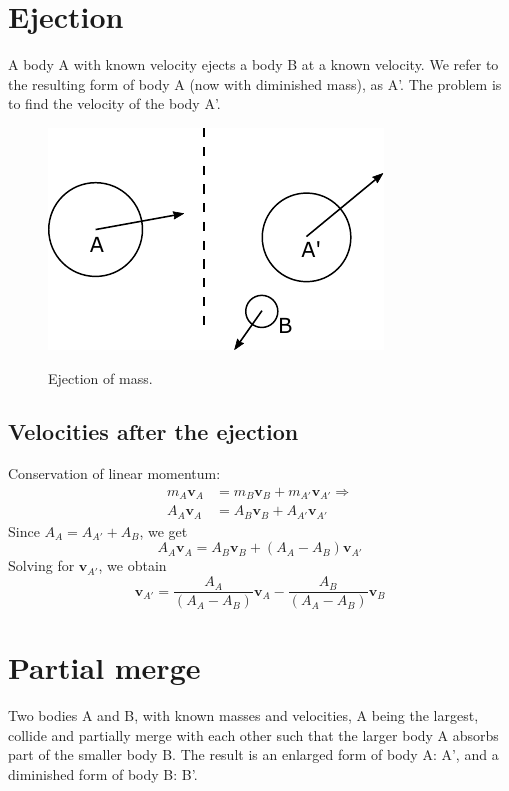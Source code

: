 \documentclass{article}
\newcommand{\vbs}[0]{\boldsymbol{v}}
\begin{document}
\section{Ejection}
A body A with known velocity ejects a body B at a known velocity. We refer to the resulting form of body A (now with diminished mass), as A'. The problem is to find the velocity of the body A'.

\begin{figure}[h]
	\centering
	{\includegraphics{figures/ejection.pdf}}
	\caption{Ejection of mass.}\label{fig:ejection}
\end{figure}

\subsection{Velocities after the ejection}

Conservation of linear momentum:
\begin{equation*}
\begin{split}
m_A\vbs_A &= m_B\vbs_B + m_{A'}\vbs_{A'}
\Rightarrow
\\A_A\vbs_A &= A_B\vbs_B + A_{A'}\vbs_{A'}
\end{split}
\end{equation*}
Since $A_A = A_{A'} + A_B$, we get
\begin{equation*}
A_A\vbs_A = A_B\vbs_B + (A_A - A_B)\vbs_{A'}
\end{equation*}
Solving for $\vbs_{A'}$, we obtain
\begin{equation}
\vbs_{A'} = \frac{A_A}{(A_A - A_B)}\vbs_A - \frac{A_B}{(A_A - A_B)}\vbs_B
\end{equation}

\section{Partial merge}
Two bodies A and B, with known masses and velocities, A being the largest, collide and partially merge with each other such that the larger body A absorbs part of the smaller body B. The result is an enlarged form of body A: A', and a diminished form of body B: B'.
\end{document}
